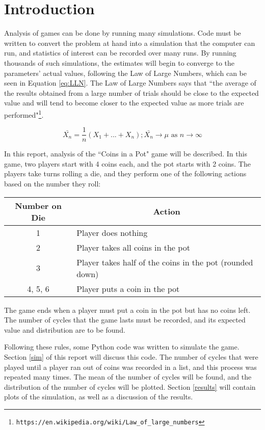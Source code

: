\section{Introduction}

Analysis of games can be done by running many simulations. Code must be written to convert the problem at hand into a simulation that the computer can run, and statistics of interest can be recorded over many runs. By running thousands of such simulations, the estimates will begin to converge to the parameters' actual values, following the Law of Large Numbers, which can be seen in Equation \ref{eq:LLN}. The Law of Large Numbers says that ``the average of the results obtained from a large number of trials should be close to the expected value and will tend to become closer to the expected value as more trials are performed"\footnote{\texttt{https://en.wikipedia.org/wiki/Law\_of\_large\_numbers}}.

\begin{equation} \label{eq:LLN}
\bar{X_n} = \frac{1}{n}(X_1 + ... + X_n); \bar{X_n} \rightarrow \mu \text{ as } n \rightarrow \infty
\end{equation}

In this report, analysis of the ``Coins in a Pot" game will be described. In this game, two players start with 4 coins each, and the pot starts with 2 coins. The players take turns rolling a die, and they perform one of the following actions based on the number they roll:

\begin{table}[H]
\centering
\begin{tabular}{|c|l|}
\hline
\textbf{Number on Die} & \multicolumn{1}{c|}{\textbf{Action}}                     \\ \hline
1                      & Player does nothing                                      \\ \hline
2                      & Player takes all coins in the pot                        \\ \hline
3                      & Player takes half of the coins in the pot (rounded down) \\ \hline
4, 5, 6                & Player puts a coin in the pot                            \\ \hline
\end{tabular}
\end{table}

The game ends when a player must put a coin in the pot but has no coins left. The number of cycles that the game lasts must be recorded, and its expected value and distribution are to be found.

Following these rules, some Python code was written to simulate the game. Section \ref{sim} of this report will discuss this code. The number of cycles that were played until a player ran out of coins was recorded in a list, and this process was repeated many times. The mean of the number of cycles will be found, and the distribution of the number of cycles will be plotted. Section \ref{results} will contain plots of the simulation, as well as a discussion of the results.